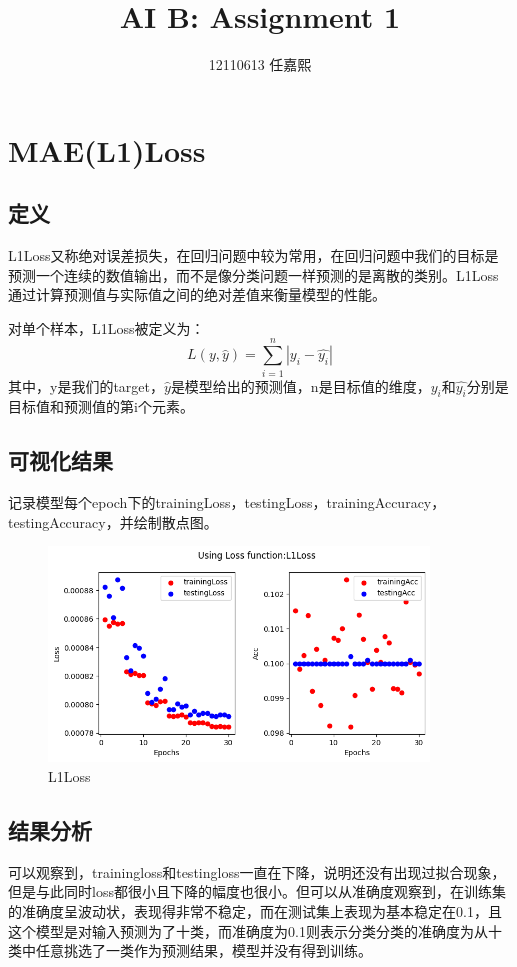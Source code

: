 \documentclass{article}
\title{AI B: Assignment 1}
\author{12110613 任嘉熙}
\begin{document}
\maketitle

\section{MAE(L1)Loss}

\subsection{定义}
L1Loss又称绝对误差损失，在回归问题中较为常用，在回归问题中我们的目标是预测一个连续的数值输出，而不是像分类问题一样预测的是离散的类别。L1Loss通过计算预测值与实际值之间的绝对差值来衡量模型的性能。

对单个样本，L1Loss被定义为：
$$
L(y,\hat{y})=\sum_{i=1}^{n}|y_i-\hat{y_i}|
$$
其中，y是我们的target，$\hat{y}$是模型给出的预测值，n是目标值的维度，$y_i$和$\hat{y_i}$分别是目标值和预测值的第i个元素。

\subsection{可视化结果}
记录模型每个epoch下的trainingLoss，testingLoss，trainingAccuracy，testingAccuracy，并绘制散点图。
\begin{figure}[H]
    \centering
    \includegraphics[width=0.9\textwidth]{Figure/L1Loss.png}
    \caption{L1Loss}
    \label{fig:L1Loss}
\end{figure}

\subsection{结果分析}
可以观察到，trainingloss和testingloss一直在下降，说明还没有出现过拟合现象，但是与此同时loss都很小且下降的幅度也很小。但可以从准确度观察到，在训练集的准确度呈波动状，表现得非常不稳定，而在测试集上表现为基本稳定在0.1，且这个模型是对输入预测为了十类，而准确度为0.1则表示分类分类的准确度为从十类中任意挑选了一类作为预测结果，模型并没有得到训练。
\end{document}
